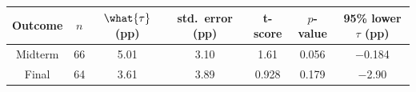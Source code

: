 \begin{tabular}{|c|c|c|c|c|c|c|}
\hline
Outcome & $n$ & $\what{\tau}$ (pp) & std.\ error (pp) & t-score & $p$-value & 95\% lower $\tau$ (pp) \\
\hline\hline
Midterm & 66 & 5.01 & 3.10 & 1.61 & 0.056 & $-$0.184 \\
\hline
Final & 64 & 3.61 & 3.89 & 0.928 & 0.179 & $-$2.90 \\
\hline
\end{tabular}
